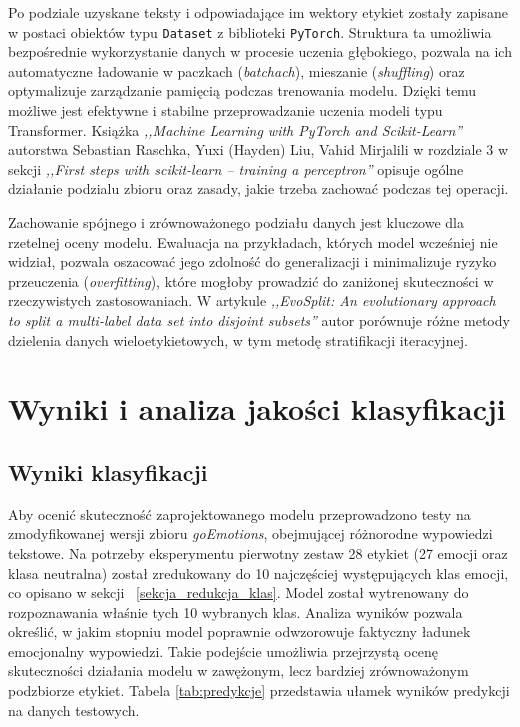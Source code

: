 \documentclass[wmii, inf, mgr]{uwmthesis}
\begin{document}
Po podziale uzyskane teksty i odpowiadające im wektory etykiet zostały zapisane w postaci obiektów typu \texttt{Dataset} z biblioteki \texttt{PyTorch}. Struktura ta umożliwia bezpośrednie wykorzystanie danych w procesie uczenia głębokiego, pozwala na ich automatyczne ładowanie w paczkach (\textit{batchach}), mieszanie (\textit{shuffling}) oraz optymalizuje zarządzanie pamięcią podczas trenowania modelu. Dzięki temu możliwe jest efektywne i stabilne przeprowadzanie uczenia modeli typu Transformer. Książka \textit{,,Machine Learning with PyTorch and Scikit-Learn''} \cite{MLpytorch} autorstwa Sebastian Raschka, Yuxi (Hayden) Liu, Vahid Mirjalili w rozdziale 3 w sekcji \textit{,,First steps with scikit-learn -- training a perceptron''} opisuje ogólne działanie podzialu zbioru oraz zasady, jakie trzeba zachować podczas tej operacji.

Zachowanie spójnego i zrównoważonego podziału danych jest kluczowe dla rzetelnej oceny modelu. Ewaluacja na przykładach, których model wcześniej nie widział, pozwala oszacować jego zdolność do generalizacji i minimalizuje ryzyko przeuczenia (\textit{overfitting}), które mogłoby prowadzić do zaniżonej skuteczności w rzeczywistych zastosowaniach. W artykule \textit{,,EvoSplit: An evolutionary approach to split a multi-label data set into disjoint subsets''} \cite{EvoSplit} autor porównuje różne metody dzielenia danych wieloetykietowych, w tym metodę stratifikacji iteracyjnej.



\section{Wyniki i analiza jakości klasyfikacji}

\subsection{Wyniki klasyfikacji}
Aby ocenić skuteczność zaprojektowanego modelu przeprowadzono testy na zmodyfikowanej wersji zbioru \textit{goEmotions}, obejmującej różnorodne wypowiedzi tekstowe. Na potrzeby eksperymentu pierwotny zestaw 28 etykiet (27 emocji oraz klasa neutralna) został zredukowany do 10 najczęściej występujących klas emocji, co opisano w sekcji ~\ref{sekcja_redukcja_klas}. Model został wytrenowany do rozpoznawania właśnie tych 10 wybranych klas. Analiza wyników pozwala określić, w jakim stopniu model poprawnie odwzorowuje faktyczny ładunek emocjonalny wypowiedzi. Takie podejście umożliwia przejrzystą ocenę skuteczności działania modelu w zawężonym, lecz bardziej zrównoważonym podzbiorze etykiet. Tabela \ref{tab:predykcje} przedstawia ułamek wyników predykcji na danych testowych. 
\end{document}
